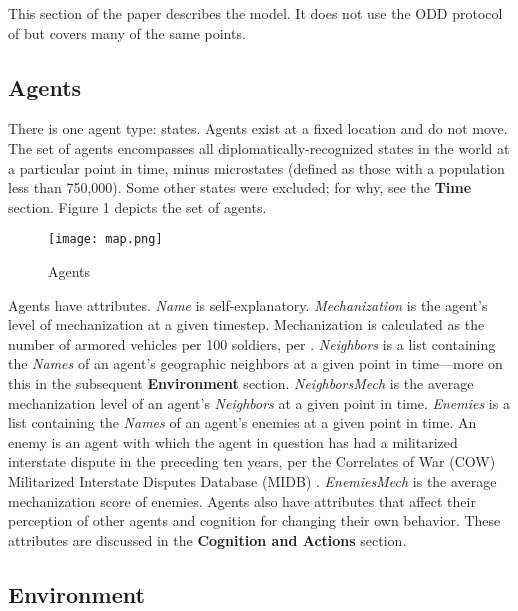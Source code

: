 \documentclass{article}
\begin{document}
This section of the paper describes the model. It does not use the ODD protocol
of \citet{grimm2006standard} but covers many of the same points.

\subsection{Agents}

There is one agent type: states. Agents exist at a fixed location and do not
move. The set of agents encompasses all diplomatically-recognized 
states in the world at a particular point in time, minus microstates (defined as
those with a population less than 750,000). Some other states were excluded; for
why, see the \textbf{Time}
section. Figure 1 depicts the set of agents.

\begin{figure}[h!]
	\centering
	\caption{Agents}
\texttt{[image: map.png]}
\end{figure}

Agents have attributes. \textit{Name} is self-explanatory.
\textit{Mechanization} is the agent's level of mechanization at a given
timestep. Mechanization is calculated as the number of armored vehicles per 100
soldiers, per \citet{sechser2010army}. \textit{Neighbors} is a list containing
the \textit{Names} of an agent's geographic neighbors at a given point in
time---more on this in the subsequent \textbf{Environment} section. \textit{NeighborsMech} is the
average mechanization level of an agent's \textit{Neighbors} at a given point in
time. \textit{Enemies} is a list containing the \textit{Names} of an agent's
enemies at a given point in time. An enemy is an agent with which the agent in
question has had a militarized interstate dispute in the preceding ten years,
per the Correlates of War (COW) Militarized Interstate Disputes Database (MIDB)
\citep{cow_midb}. \textit{EnemiesMech} is the average mechanization score of
enemies. Agents also have attributes that affect their
perception of other agents and cognition for changing their own behavior. These
attributes are discussed in the \textbf{Cognition and Actions} section.


\subsection{Environment}
\end{document}
